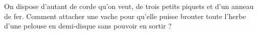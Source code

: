 On dispose d'autant de corde qu'on veut, de trois petits piquets et d'un anneau de fer. Comment attacher une vache pour qu'elle puisse brouter toute l'herbe d'une pelouse en demi-disque sans pouvoir en sortir ?
